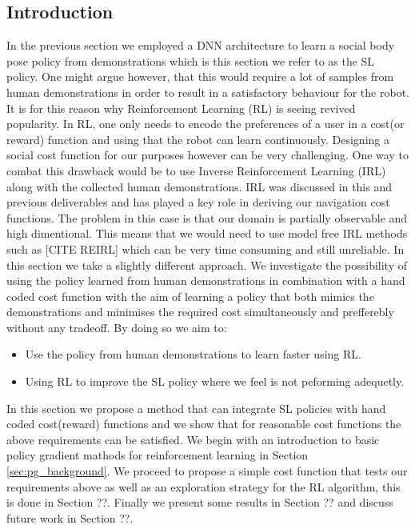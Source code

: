 \documentclass[a4paper,11pt]{report}
\begin{document}
\subsection{Introduction}
In the previous section we employed a DNN architecture to learn a social body pose policy from demonstrations which is this section we refer to as the SL policy. One might argue however, that this would require a lot of samples from human demonstrations in order to result in a satisfactory behaviour for the robot. It is for this reason why Reinforcement Learning (RL) is seeing revived popularity. In RL, one only needs to encode the preferences of a user in a cost(or reward) function and using that the robot can learn continuously. Designing a social cost function for our purposes however can be very challenging. One way to combat this drawback would be to use Inverse Reinforcement Learning (IRL) along with the collected human demonstrations. IRL was discussed in this and previous deliverables and has played a key role in deriving our navigation cost functions. The problem in this case is that our domain is partially observable and high dimentional. This means that we would need to use model free IRL methods such as [CITE REIRL] which can be very time consuming and still unreliable. In this section we take a slightly different approach. We investigate the possibility of using the policy learned from human demonstrations in combination with a hand coded cost function with the aim of learning a policy that both mimics the demonstrations and minimises the required cost simultaneously and prefferebly without any tradeoff. By doing so we aim to:

\begin{itemize}
	\item Use the policy from human demonstrations to learn faster using RL.
	\item Using RL to improve the SL policy where we feel is not peforming adequetly.   
\end{itemize}

In this section we propose a method that can integrate SL policies with hand coded cost(reward) functions and we show that for reasonable cost functions the above requirements can be satisfied. We begin with an introduction to basic policy gradient mathods for reinforcement learning in Section \ref{sec:pg_background}. We proceed to propose a simple cost function that tests our requirements above as well as an exploration strategy for the RL algorithm, this is done in Section ??. Finally we present some results in Section ?? and discuss future work in Section ??.
\end{document}

